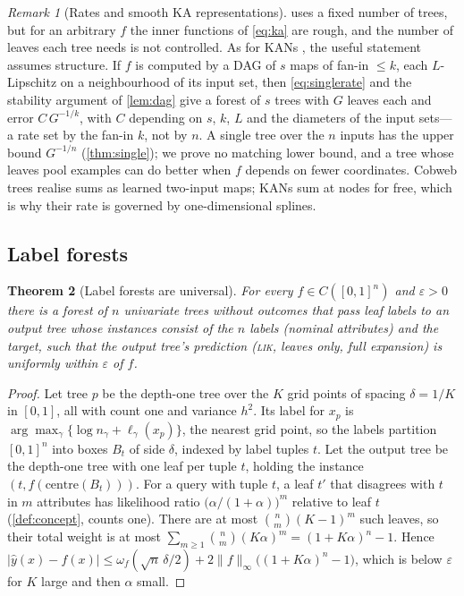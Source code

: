 \documentclass[11pt]{article}
\newtheorem{theorem}{Theorem}
\theoremstyle{definition}
\theoremstyle{remark}
\newtheorem{remark}[theorem]{Remark}
\newcommand{\hy}{\hat{y}}
\begin{document}
\begin{remark}[Rates and smooth KA representations]\label{rem:rates}
 uses a fixed number of trees, but for an arbitrary $f$ the inner functions
of \eqref{eq:ka} are rough, and the number of leaves each tree needs is not controlled.
As for KANs \citep[Thm.~2.1]{liu2024kan}, the useful statement assumes structure.  If
$f$ is computed by a DAG of $s$ maps of fan-in $\le k$, each $L$-Lipschitz on a
neighbourhood of its input set, then \eqref{eq:singlerate} and the stability argument of
\cref{lem:dag} give a forest of $s$ trees with $G$ leaves each and error $C\,G^{-1/k}$, with $C$
depending on $s$, $k$, $L$ and the diameters of the input sets---a rate set by the fan-in
$k$, not by $n$.  A single
tree over the $n$ inputs has the upper bound $G^{-1/n}$ (\cref{thm:single}); we prove no
matching lower bound, and a tree whose leaves pool examples can do better when $f$
depends on fewer coordinates.  Cobweb trees realise
sums as learned two-input maps; KANs sum at nodes for free, which is why their rate is
governed by one-dimensional splines.
\end{remark}

\subsection{Label forests}

\begin{theorem}[Label forests are universal]\label{thm:label}
For every $f\in C([0,1]^n)$ and $\varepsilon>0$ there is a forest of $n$ univariate trees
without outcomes that pass leaf labels to an output tree whose instances consist of the
$n$ labels (nominal attributes) and the target, such that the output tree's prediction
(\textsc{lik}, leaves only, full expansion) is uniformly within $\varepsilon$ of $f$.
\end{theorem}
\begin{proof}
Let tree $p$ be the depth-one tree over the $K$ grid points of spacing $\delta=1/K$ in
$[0,1]$, all with count one and variance $h^2$.  Its label for $x_p$ is
$\arg\max_\gamma\{\log n_\gamma+\ell_\gamma(x_p)\}$, the nearest grid point, so the
labels partition $[0,1]^n$ into boxes $B_t$ of side $\delta$, indexed by label tuples
$t$.  Let the output tree be the depth-one tree with one leaf per tuple $t$, holding the
instance $(t,f(\text{centre}(B_t)))$.  For a query with tuple $t$, a leaf $t'$ that
disagrees with $t$ in $m$ attributes has likelihood ratio $\bigl(\alpha/(1+\alpha)\bigr)^m$
relative to leaf $t$ (\cref{def:concept}, counts one).  There are at most
$\binom nm(K-1)^m$ such leaves, so their total weight is at most
$\sum_{m\ge1}\binom nm(K\alpha)^m=(1+K\alpha)^n-1$.  Hence
$|\hy(x)-f(x)|\le\omega_f(\sqrt n\,\delta/2)+2\|f\|_\infty\bigl((1+K\alpha)^n-1\bigr)$,
which is below $\varepsilon$ for $K$ large and then $\alpha$ small.
\end{proof}
\end{document}
